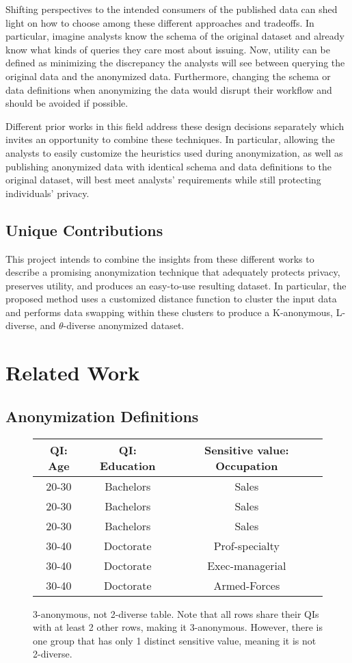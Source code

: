 Shifting perspectives to the intended consumers of the published data can shed light on how to choose among these different approaches and tradeoffs. In particular, imagine analysts know the schema of the original dataset and already know what kinds of queries they care most about issuing. Now, utility can be defined as minimizing the discrepancy the analysts will see between querying the original data and the anonymized data. Furthermore, changing the schema or data definitions when anonymizing the data would disrupt their workflow and should be avoided if possible.

Different prior works in this field address these design decisions separately which invites an opportunity to combine these techniques. In particular, allowing the analysts to easily customize the heuristics used during anonymization, as well as publishing anonymized data with identical schema and data definitions to the original dataset, will best meet analysts' requirements while still protecting individuals' privacy.

\subsection{Unique Contributions}
This project intends to combine the insights from these different works to describe a promising anonymization technique that adequately protects privacy, preserves utility, and produces an easy-to-use resulting dataset. In particular, the proposed method uses a customized distance function\cite{jiaPad} to cluster the input data and performs data swapping\cite{soriaSwapping} within these clusters to produce a K-anonymous, L-diverse\cite{machanavajjhalalDiversity}, and $\theta$-diverse anonymized dataset.

\section{Related Work}
\subsection{Anonymization Definitions}

\begin{figure*}
\centering
\begin{tabular}{|c|c|c|}
\hline
QI: Age & QI: Education & Sensitive value: Occupation  \\
\hline
\hline
20-30 & Bachelors & Sales \\
\hline
20-30 & Bachelors & Sales  \\
\hline
20-30 & Bachelors & Sales  \\
\hline
30-40 & Doctorate & Prof-specialty  \\
\hline
30-40 & Doctorate & Exec-managerial  \\
\hline
30-40 & Doctorate & Armed-Forces  \\
\hline
\end{tabular}
\caption{3-anonymous, not 2-diverse table. Note that all rows share their QIs with at least 2 other rows, making it 3-anonymous. However, there is one group that has only 1 distinct sensitive value, meaning it is not 2-diverse.}
\label{fig:anonTable}
\end{figure*}

